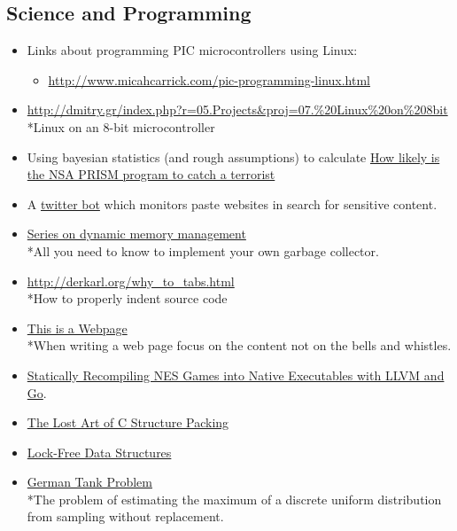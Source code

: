 \documentclass{article}
\begin{document}
\subsection{Science and Programming}
\begin{itemize}
      \item Links about programming PIC microcontrollers using Linux:
      \begin{itemize}
            \item \url{http://www.micahcarrick.com/pic-programming-linux.html}
      \end{itemize}
      \item \url{http://dmitry.gr/index.php?r=05.Projects&proj=07.%20Linux%20on%208bit}
      \\*Linux on an 8-bit microcontroller
      \item Using bayesian statistics (and rough assumptions) to calculate \href{http://bayesianbiologist.com/2013/06/06/how-likely-is-the-nsa-prism-program-to-catch-a-terrorist/}{How likely is the NSA PRISM program to catch a terrorist}
      \item A \href{http://raidersec.blogspot.it/2013/03/introducing-dumpmon-twitter-bot-that.html}{twitter bot} which monitors paste websites in search for sensitive content. 
      \item \href{http://blogs.msdn.com/b/abhinaba/archive/2009/01/25/back-to-basic-series-on-dynamic-memory-management.aspx}{Series on dynamic memory management}
      \\*All you need to know to implement your own garbage collector.
	
	\item \url{http://derkarl.org/why_to_tabs.html}
      \\*How to properly indent source code 
      \item \href{http://justinjackson.ca/words.html}{This is a Webpage}
      \\*When writing a web page focus on the content not on the bells and whistles. 
      \item \href{http://andrewkelley.me/post/jamulator.html}{Statically Recompiling NES Games into Native Executables with LLVM and Go}.
      \item \href{http://www.catb.org/esr/structure-packing/}{The Lost Art of C Structure Packing}
      \item \href{http://www.drdobbs.com/lock-free-data-structures/184401865}{Lock-Free Data Structures}
      \item \href{http://en.wikipedia.org/wiki/German_tank_problem}{German Tank Problem}
      \\*The problem of estimating the maximum of a discrete uniform distribution from sampling without replacement.

\end{itemize}
%
%
\end{document}
